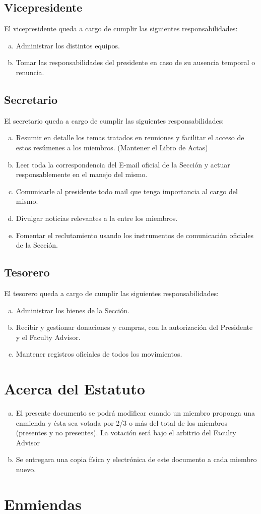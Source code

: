 \documentclass[12pt]{article}
\begin{document}
\subsection{Vicepresidente}
El vicepresidente queda a cargo de cumplir las siguientes responsabilidades:
\begin{enumerate}[a)]
\item Administrar los distintos equipos. 
\item Tomar las responsabilidades del presidente en caso de su ausencia temporal o renuncia.
\end{enumerate}



\subsection{Secretario}
El secretario queda a cargo de cumplir las siguientes responsabilidades:
\begin{enumerate}[a)]
\item Resumir en detalle los temas tratados en reuniones y facilitar el acceso de estos resúmenes a los miembros. (Mantener el Libro de Actas)
\item Leer toda la correspondencia del E-mail oficial de la Sección y actuar responsablemente en el manejo del mismo.
\item Comunicarle al presidente todo mail que tenga importancia al cargo del mismo.
\item Divulgar noticias relevantes a la entre los miembros.
\item Fomentar el reclutamiento usando los instrumentos de comunicación oficiales de la Sección.
\end{enumerate}

\subsection{Tesorero}
El tesorero queda a cargo de cumplir las siguientes responsabilidades:
\begin{enumerate}[a)]
\item Administrar los bienes de la Sección.
\item Recibir y gestionar donaciones y compras, con la autorización del Presidente y el Faculty Advisor.
\item Mantener registros oficiales de todos los movimientos. 
\end{enumerate}
\section{Acerca del Estatuto}
\begin{enumerate}[a)]
\item El presente documento se podrá modificar cuando un miembro proponga una enmienda y ésta sea votada por 2/3 o más del total de los miembros (presentes y no presentes). La votación será bajo el arbitrio del Faculty Advisor
\item Se entregara una copia física y electrónica de este documento a cada miembro nuevo.
\end{enumerate}
\section{Enmiendas}
\end{document}
